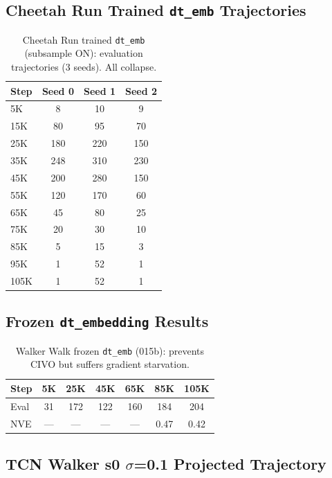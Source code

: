 \documentclass{article}
\begin{document}
\subsection{Cheetah Run Trained \texttt{dt\_emb} Trajectories}

\begin{table}[h]
\centering
\caption{Cheetah Run trained \texttt{dt\_emb} (subsample ON): evaluation trajectories (3 seeds). All collapse.}
\label{tab:appendix-cheetah-traj}
\begin{tabular}{lccc}
\toprule
\textbf{Step} & \textbf{Seed 0} & \textbf{Seed 1} & \textbf{Seed 2} \\
\midrule
5K & 8 & 10 & 9 \\
15K & 80 & 95 & 70 \\
25K & 180 & 220 & 150 \\
35K & 248 & 310 & 230 \\
45K & 200 & 280 & 150 \\
55K & 120 & 170 & 60 \\
65K & 45 & 80 & 25 \\
75K & 20 & 30 & 10 \\
85K & 5 & 15 & 3 \\
95K & 1 & 52 & 1 \\
105K & 1 & 52 & 1 \\
\bottomrule
\end{tabular}
\end{table}

\subsection{Frozen \texttt{dt\_embedding} Results}

\begin{table}[h]
\centering
\caption{Walker Walk frozen \texttt{dt\_emb} (015b): prevents CIVO but suffers gradient starvation.}
\label{tab:appendix-frozen}
\begin{tabular}{lcccccc}
\toprule
\textbf{Step} & 5K & 25K & 45K & 65K & 85K & 105K \\
\midrule
Eval & 31 & 172 & 122 & 160 & 184 & 204 \\
NVE & --- & --- & --- & --- & 0.47 & 0.42 \\
\bottomrule
\end{tabular}
\end{table}

\subsection{TCN Walker s0 $\sigma$=0.1 Projected Trajectory}
\end{document}
